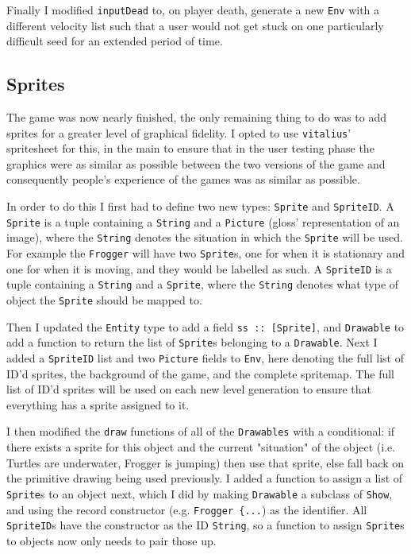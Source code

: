\documentclass[12pt, a4paper]{report}
\begin{document}
\par

Finally I modified \verb|inputDead| to, on player death, generate a new \verb|Env| with a different velocity list such that a user would not get stuck on one particularly difficult seed for an extended period of time.

\subsection{Sprites}

The game was now nearly finished, the only remaining thing to do was to add sprites for a greater level of graphical fidelity.
I opted to use \verb|vitalius|' spritesheet for this, in the main to ensure that in the user testing phase the graphics were as similar as possible between the two versions of the game and consequently people's experience of the games was as similar as possible.

\par

In order to do this I first had to define two new types: \verb|Sprite| and \verb|SpriteID|.
A \verb|Sprite| is a tuple containing a \verb|String| and a \verb|Picture| (gloss' representation of an image), where the \verb|String| denotes the situation in which the \verb|Sprite| will be used.
For example the \verb|Frogger| will have two \verb|Sprite|s, one for when it is stationary and one for when it is moving, and they would be labelled as such.
A \verb|SpriteID| is a tuple containing a \verb|String| and a \verb|Sprite|, where the \verb|String| denotes what type of object the \verb|Sprite| should be mapped to.

\par

Then I updated the \verb|Entity| type to add a field \verb|ss :: [Sprite]|, and \verb|Drawable| to add a function to return the list of \verb|Sprite|s belonging to a \verb|Drawable|.
Next I added a \verb|SpriteID| list and two \verb|Picture| fields to \verb|Env|, here denoting the full list of ID'd sprites, the background of the game, and the complete spritemap.
The full list of ID'd sprites will be used on each new level generation to ensure that everything has a sprite assigned to it.

\par

I then modified the \verb|draw| functions of all of the \verb|Drawables| with a conditional: if there exists a sprite for this object and the current "situation" of the object (i.e. Turtles are underwater, Frogger is jumping) then use that sprite, else fall back on the primitive drawing being used previously.
I added a function to assign a list of \verb|Sprite|s to an object next, which I did by making \verb|Drawable| a subclass of \verb|Show|, and using the record constructor (e.g. \verb|Frogger {...|) as the identifier.
All \verb|SpriteID|s have the constructor as the ID \verb|String|, so a function to assign \verb|Sprite|s to objects now only needs to pair those up.
\end{document}
